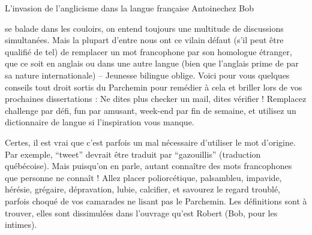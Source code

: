 \vspace*{-1.2cm}
\begin{article}
{L'invasion de l'anglicisme dans la langue française}
{Antoine}{chez Bob}

\begin{spacing}{1.05}
\vspace*{1mm}
 se balade dans les couloirs, on entend toujours une multitude de discussions simultanées.  Mais la plupart d'entre nous ont ce vilain défaut (s'il peut être qualifié de tel) de remplacer un mot francophone par son homologue étranger, que ce soit en anglais ou dans une autre langue (bien que l'anglais prime de par sa nature internationale) -- Jeunesse bilingue oblige. Voici pour vous quelques conseils tout droit sortis du Parchemin pour remédier à cela et briller lors de vos prochaines dissertations : Ne dites plus checker un mail, dites vérifier ! Remplacez challenge par défi, fun par amusant, week-end par fin de semaine, et utilisez un dictionnaire de langue si l'inspiration vous manque.

Certes, il est vrai que c'est parfois un mal nécessaire d'utiliser le mot d'origine. Par exemple, \enquote{tweet} devrait être traduit par \enquote{gazouillis} (traduction québécoise). Mais puisqu'on en parle, autant connaître des mots francophones que personne ne connaît ! Allez placer poliorcétique, palsambleu, impavide, hérésie, grégaire, dépravation, lubie, calcifier, et savourez le regard troublé, parfois choqué de vos camarades ne lisant pas le Parchemin. Les définitions sont à trouver, elles sont dissimulées dans l’ouvrage qu'est Robert (Bob, pour les intimes).\end{spacing}

\end{article}

\ligne


